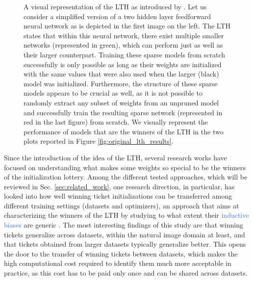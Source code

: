\begin{figure}[!htb]
\endminipage
\caption{A visual representation of the LTH as introduced by \citet{frankle2018lottery}. Let us consider a simplified version of a two hidden layer feedforward neural network as is depicted in the first image on the left. The LTH states that within this neural network, there exist multiple smaller networks (represented in green), which can perform just as well as their larger counterpart. Training these sparse models from scratch successfully is only possible as long as their weights are initialized with the same values that were also used when the larger (black) model was initialized. Furthermore, the structure of these sparse models appears to be crucial as well, as it is not possible to randomly extract any subset of weights from an unpruned model and successfully train the resulting sparse network (represented in red in the last figure) from scratch. We visually represent the performance of models that are the winners of the LTH in the two plots reported in Figure \ref{fig:original_lth_results}.} 
\label{fig:tickets_visualization}
\end{figure}


%

Since the introduction of the idea of the LTH, several research works have focused on understanding what makes some weights so special to be the winners of the initialization lottery. Among the different tested approaches, which will be reviewed in Sec. \ref{sec:related_work}, one research direction, in particular, has looked into how well winning ticket initializations can be transferred among different training settings (datasets and optimizers), an approach that aims at characterizing the winners of the LTH by studying to what extent their \textcolor{RoyalBlue}{inductive biases} are generic \cite{morcos2019one}. The most interesting findings of this study are that winning tickets generalize across datasets, within the natural image domain at least, and that tickets obtained from larger datasets typically generalize better. This opens the door to the transfer of winning tickets between datasets, which makes the high computational cost required to identify them much more acceptable in practice, as this cost has to be paid only once and can be shared across datasets.

